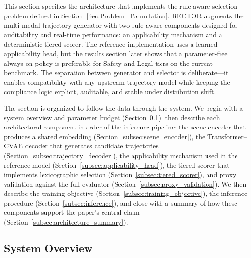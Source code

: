 This section specifies the architecture that implements the rule-aware selection problem defined in Section~\ref{Sec:Problem_Formulation}.  RECTOR augments the multi-modal trajectory generator with two rule-aware components designed for auditability and real-time performance: an applicability mechanism and a deterministic tiered scorer.  The reference implementation uses a learned applicability head, but the results section later shows that a parameter-free always-on policy is preferable for Safety and Legal tiers on the current benchmark.  The separation between generator and selector is deliberate---it enables compatibility with any upstream trajectory model while keeping the compliance logic explicit, auditable, and stable under distribution shift.

The section is organized to follow the data through the system.  We begin with a system overview and parameter budget (Section~\ref{subsec:system_overview}), then describe each architectural component in order of the inference pipeline: the scene encoder that produces a shared embedding (Section~\ref{subsec:scene_encoder}), the Transformer--CVAE decoder that generates candidate trajectories (Section~\ref{subsec:trajectory_decoder}), the applicability mechanism used in the reference model (Section~\ref{subsec:applicability_head}), the tiered scorer that implements lexicographic selection (Section~\ref{subsec:tiered_scorer}), and proxy validation against the full evaluator (Section~\ref{subsec:proxy_validation}).  We then describe the training objective (Section~\ref{subsec:training_objective}), the inference procedure (Section~\ref{subsec:inference}), and close with a summary of how these components support the paper's central claim (Section~\ref{subsec:architecture_summary}).

\subsection{System Overview}
\label{subsec:system_overview}

